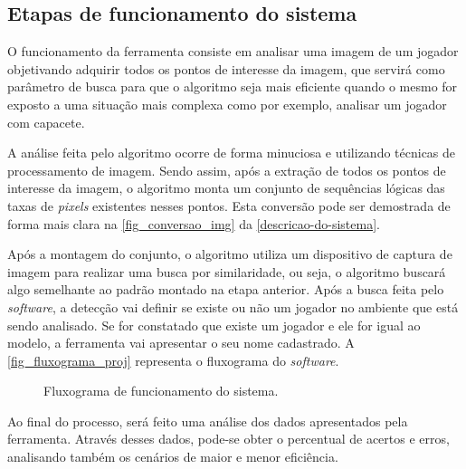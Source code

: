 \subsection{{Etapas de funcionamento do sistema}}

O funcionamento da ferramenta consiste em analisar uma imagem de um jogador objetivando adquirir todos os pontos de interesse da imagem, que servirá como parâmetro de busca para que o algoritmo seja mais eficiente quando o  mesmo for exposto a uma situação mais complexa como por exemplo, analisar um jogador com capacete.

A análise feita pelo algoritmo ocorre de forma minuciosa e utilizando técnicas de processamento de imagem. Sendo assim, após a extração de todos os pontos de interesse da imagem, o algoritmo monta um conjunto de sequências lógicas das taxas de \textit{pixels} existentes nesses pontos. Esta conversão pode ser demostrada de forma mais clara na \autoref{fig_conversao_img} da \autoref{descricao-do-sistema}.

Após a montagem do conjunto, o algoritmo utiliza um dispositivo de captura de imagem para realizar uma busca por similaridade, ou seja, o algoritmo buscará algo semelhante ao padrão montado na etapa anterior. Após a busca feita pelo \textit{software}, a detecção vai definir se existe ou não um jogador no ambiente que está sendo analisado. Se for constatado que existe um jogador e ele for igual ao modelo, a ferramenta vai apresentar o seu nome cadastrado. A \autoref{fig_fluxograma_proj} representa o fluxograma do \textit{software}.

\begin{figure}[h]
	\caption{\label{fig_fluxograma_proj}Fluxograma de funcionamento do sistema.}
	\begin{center}
	\end{center}
	\centering {}
\end{figure}

Ao final do processo, será feito uma análise dos dados apresentados pela ferramenta. Através desses dados, pode-se obter o percentual de acertos e erros, analisando também os cenários de maior e menor eficiência.